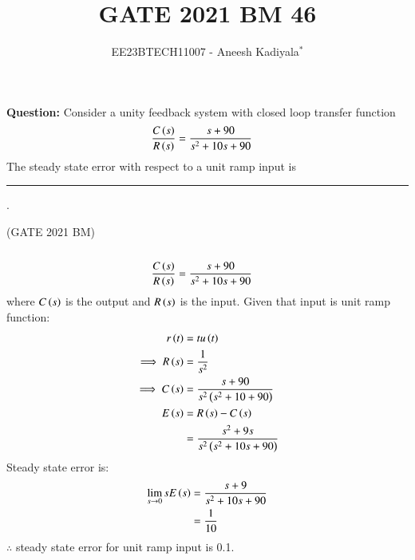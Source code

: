 \documentclass[journal,12pt,twocolumn]{IEEEtran}
\theoremstyle{remark}
\begin{document}

\vspace{3cm}

\title{GATE 2021 BM 46}
\author{EE23BTECH11007 - Aneesh Kadiyala$^{*}$%
}
\maketitle
\newpage
\bigskip

\renewcommand{\thefigure}{\theenumi}
\renewcommand{\thetable}{\theenumi}

\vspace{3cm}
\textbf{Question:} Consider a unity feedback system with closed loop transfer function
\begin{align*}
\frac{C\left(s\right)}{R\left(s\right)} &= \frac{s + 90}{s^2 + 10s + 90}
\end{align*}
The steady state error with respect to a unit ramp input is \rule{1cm}{0.15mm} . 

\hfill(GATE 2021 BM)
\\
\solution
\\
\begin{align}
\frac{C\left(s\right)}{R\left(s\right)} &= \frac{s + 90}{s^2 + 10s + 90}
\end{align}
where $C\left(s\right)$ is the output and $R\left(s\right)$ is the input.
Given that input is unit ramp function:
\begin{align}
r\left(t\right) &= tu\left(t\right) \\
\implies R\left(s\right) &= \frac{1}{s^2} \\
\implies C\left(s\right) &= \frac{s + 90}{s^2\left(s^2+10+90\right)} \\
E\left(s\right) &= R\left(s\right) - C\left(s\right) \\
&= \frac{s^2+9s}{s^2\left(s^2+10s+90\right)}
\end{align}
Steady state error is:
\begin{align}
\lim_{s\to0}{sE\left(s\right)} &= \frac{s + 9}{s^2 + 10s + 90} \\
&= \frac{1}{10}
\end{align}
$\therefore$ steady state error for unit ramp input is 0.1.
\end{document}

